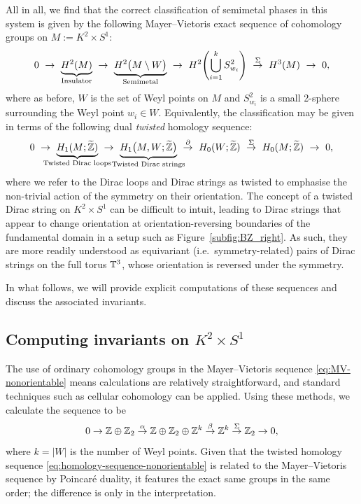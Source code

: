 All in all, we find that the correct classification of semimetal phases in this system is given by the following Mayer--Vietoris exact sequence of cohomology groups on $M := K^2\times S^1$:
\begin{equation}\label{eq:MV-nonorientable}
	0\ \to\ \underbrace{H^2(M)}_{\mathclap{\text{Insulator}}}\ \to\ \underbrace{H^2\big(M\setminus W\big)}_{\mathclap{\text{Semimetal}}}\ \to\ H^2\!\left(\bigcup_{i=1}^k S_{w_i}^2\right)\ \overset{\Sigma}{\to}\ H^3(M)\ \to\ 0,
\end{equation}
where as before, $W$ is the set of Weyl points on $M$ and $S_{w_i}^2$ is a small 2-sphere surrounding the Weyl point $w_i\in W$. Equivalently, the classification may be given in terms of the following dual \emph{twisted} homology sequence:
\begin{equation}\label{eq:homology-sequence-nonorientable}
	0\ \to\ \underbrace{H_1(M;\ext{\Z})}_{\mathclap{\text{Twisted Dirac loops}}}\ \to\ \underbrace{H_1\big(M, W;\ext{\Z}\big)}_{\mathclap{\text{Twisted Dirac strings}}}\ \overset{\partial}{\to}\ H_0(W;\ext{\Z})\ \overset{\Sigma}{\to}\ H_0(M;\ext{\Z})\ \to\ 0,
\end{equation}
where we refer to the Dirac loops and Dirac strings as twisted to emphasise the non-trivial action of the symmetry on their orientation. The concept of a twisted Dirac string on $K^2\times S^1$ can be difficult to intuit, leading to Dirac strings that appear to change orientation at orientation-reversing boundaries of the fundamental domain in a setup such as Figure~\ref{subfig:BZ_right}. As such, they are more readily understood as equivariant (i.e.\ symmetry-related) pairs of Dirac strings on the full torus $\mathbb{T}^3$, whose orientation is reversed under the symmetry.

In what follows, we will provide explicit computations of these sequences and discuss the associated invariants.


\subsection{Computing invariants on $K^2\times S^1$}

The use of ordinary cohomology groups in the Mayer--Vietoris sequence \eqref{eq:MV-nonorientable} means calculations are relatively straightforward, and standard techniques such as cellular cohomology can be applied.  Using these methods, we calculate the sequence to be
\begin{equation}\label{eq:explicit-sequence-nonorientable}
	0\to \mathbb{Z}\oplus\mathbb{Z}_2 \overset{\alpha}{\to} \mathbb{Z}\oplus\mathbb{Z}_2\oplus\mathbb{Z}^k \overset{\beta}{\to} \mathbb{Z}^k \overset{\Sigma}{\to} \mathbb{Z}_2 \to 0,
\end{equation}
where $k = |W|$ is the number of Weyl points. Given that the twisted homology sequence \eqref{eq:homology-sequence-nonorientable} is related to the Mayer--Vietoris sequence by Poincaré duality, it features the exact same groups in the same order; the difference is only in the interpretation. 

